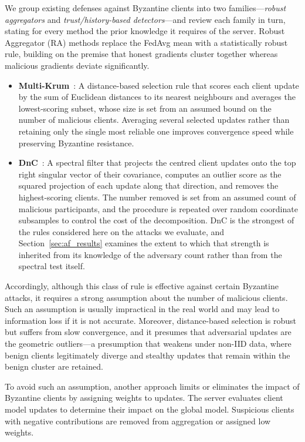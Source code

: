 \documentclass[journal]{IEEEtran}
\begin{document}
We group existing defenses against Byzantine clients into two families---\emph{robust aggregators} and \emph{trust/history-based detectors}---and review each family in turn, stating for every method the prior knowledge it requires of the server. Robust Aggregator (RA) methods replace the FedAvg mean with a statistically robust rule, building on the premise that honest gradients cluster together whereas malicious gradients deviate significantly.

\begin{itemize}
    \item \textbf{Multi-Krum}~\cite{blanchard2017machine}: A distance-based selection rule that scores each client update by the sum of Euclidean distances to its nearest neighbours and averages the lowest-scoring subset, whose size is set from an assumed bound on the number of malicious clients. Averaging several selected updates rather than retaining only the single most reliable one improves convergence speed while preserving Byzantine resistance.

    \item \textbf{DnC}~\cite{shejwalkar2021manipulating}: A spectral filter that projects the centred client updates onto the top right singular vector of their covariance, computes an outlier score as the squared projection of each update along that direction, and removes the highest-scoring clients. The number removed is set from an assumed count of malicious participants, and the procedure is repeated over random coordinate subsamples to control the cost of the decomposition. DnC is the strongest of the rules considered here on the attacks we evaluate, and Section~\ref{sec:af_results} examines the extent to which that strength is inherited from its knowledge of the adversary count rather than from the spectral test itself.
\end{itemize}

Accordingly, although this class of rule is effective against certain Byzantine attacks, it requires a strong assumption about the number of malicious clients. Such an assumption is usually impractical in the real world and may lead to information loss if it is not accurate. Moreover, distance-based selection is robust but suffers from slow convergence, and it presumes that adversarial updates are the geometric outliers---a presumption that weakens under non-IID data, where benign clients legitimately diverge and stealthy updates that remain within the benign cluster are retained.

To avoid such an assumption, another approach limits or eliminates the impact of Byzantine clients by assigning weights to updates. The server evaluates client model updates to determine their impact on the global model. Suspicious clients with negative contributions are removed from aggregation or assigned low weights.
\end{document}
